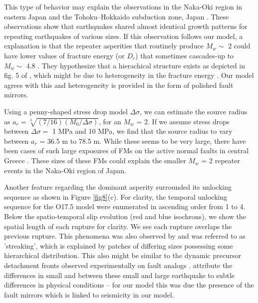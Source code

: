 \documentclass[preprint,1p, 10pt,authoryear]{elsarticle}
\begin{document}
This type of behavior may explain the observations in the Naka-Oki region in eastern Japan \citep{Okuda2018} and the Tohoku–Hokkaido subduction zone, Japan \citep{Ide2019}. These observations show that earthquakes shared almost identical growth patterns for repeating earthquakes of various sizes. If this observation follows our model, a explanation is that the repeater asperities that routinely produce  $M_{w} \sim$ 2  could have lower values of fracture energy (or $D_{c}$) that sometimes cascades-up to  $M_{w} \sim$ 4.8 \citep{Okuda2018a}.  They hypothesize that a hierachical structure exists as depicted in fig. 5 of \citet{Okuda2018}, which might be due to heterogeneity in the fracture energy \citep{Ide2005, Aochi2014, Aochi2017}. Our model agrees with this and heterogeneity is provided in the form of polished fault mirrors. 

Using a penny-shaped \citet{Eshelby1957} stress drop model $\Delta\sigma$, we can estimate the source radius as $a_{r} = \sqrt[3]{(7/16)(M_{0}/\Delta\sigma)}$, for an $M_{w}$ = 2. If we assume stress drops between $\Delta \sigma  = $ 1 MPa and 10 MPa, we find that the source radius to vary between $a_{r}$ = 36.5 m to 78.5 m.  While these seems to be very large, there have been cases of such large exposures of FMs on the active normal faults in central Greece \citep{Jackson1999}. These sizes of these FMs could explain the smaller $M_{w}$ = 2 repeater events in the Naka-Oki region of Japan.  

Another feature regarding the dominant asperity surrounded its unlocking sequence as shown in Figure \ref{fig8}(c). For clarity, the temporal unlocking sequence for the O17.5 model were enumerated in ascending order from 1 to 4.  Below the spatio-temporal slip evolution (red and blue isochrons), we show the spatial length of each rupture for clarity. We see each rupture overlaps the previous rupture. This phenomena was also observed by \citet{Okuda2018a} and was referred to as 'streaking', which is explained by patches of differing sizes possessing some hierarchical distribution. This also might be similar to the dynamic precursor detachment fronts observed experimentally on fault analogs \citep{Rubinstein2004,Rubinstein2006}. \citet{Okuda2018a} attribute the differences in small and between these small and large earthquake to subtle differences in physical conditions -- for our model this was due the presence of the fault mirrors which is linked to seismicity in our model.
\end{document}
